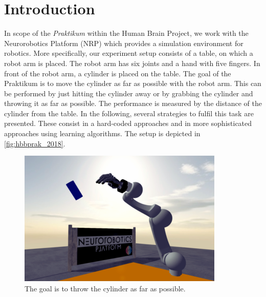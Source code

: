 \section{Introduction}
In scope of the \textit{Praktikum} within the Human Brain Project, we work with the Neurorobotics Platform (NRP) which provides a simulation environment for robotics.
More specifically, our experiment setup consists of a table, on which a robot arm is placed.
The robot arm has six joints and a hand with five fingers.
In front of the robot arm, a cylinder is placed on the table.
The goal of the Praktikum is to move the cylinder as far as possible with the robot arm.
This can be performed by just hitting the cylinder away or by grabbing the cylinder and throwing it as far as possible.
The performance is measured by the distance of the cylinder from the table.
In the following, several strategies to fulfil this task are presented.
These consist in a hard-coded approaches and in more sophisticated approaches using learning algorithms.
The setup is depicted in \autoref{fig:hbbprak_2018}.

\begin{figure}[h]
\centering
\includegraphics[width=.95\columnwidth]{figures/hbpprak_2018.png}
\caption{The goal is to throw the cylinder as far as possible.}
\label{fig:hbbprak_2018}
\end{figure}